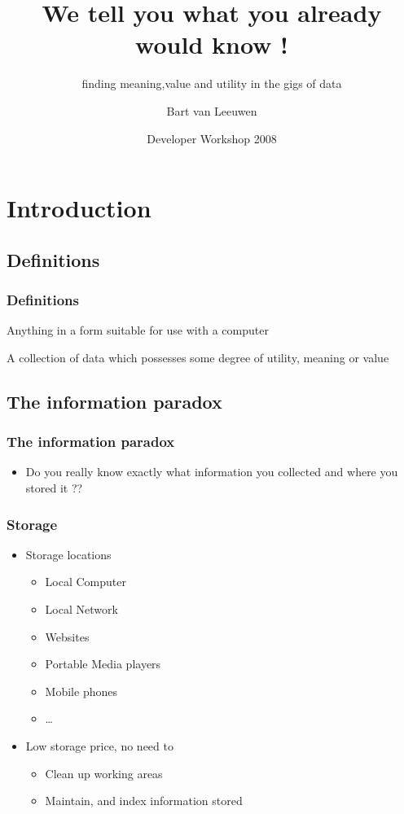 \documentclass{beamer}
\title{We tell you what you already would know !}
\subtitle{finding meaning,value and utility in the gigs of data}
\author{Bart van Leeuwen}
\institute[netlabs.org]
{
 netlabs.org
}
\date{Developer Workshop 2008}
\begin{document}
\begin{frame}
\titlepage
\end{frame}



\section{Introduction}

\subsection[Definitions]{Definitions}

\begin{frame}
\frametitle{Definitions}
\begin{definition}[Data]
Anything in a form suitable for use with a computer
\end{definition}
\begin{definition}[Information]
A collection of data which possesses some degree of utility, meaning or value
\end{definition}
\end{frame}

\subsection[Current state]{The information paradox}

\begin{frame}
\frametitle{The information paradox}
\begin{itemize}
  \item Do you really know exactly what information you collected and where you
  stored it ??
\end{itemize}
\end{frame}

\begin{frame}
\frametitle{Storage}

\begin{itemize}
  \item Storage locations
  \begin{itemize}
  	\item Local Computer
  	\item Local Network
  	\item Websites
  	\item Portable Media players
  	\item Mobile phones
  	\item \ldots
  \end{itemize}
  \item Low storage price, no need to
  \begin{itemize}
  	\item Clean up working areas
  	\item Maintain, and index information stored
  \end{itemize}
  
\end{itemize}
\end{frame}
\end{document}
